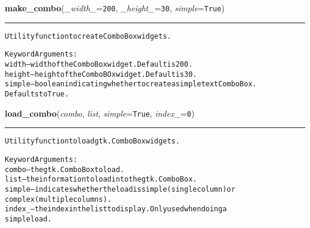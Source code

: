    \vspace{0.5ex}

\hspace{.8\funcindent}\begin{boxedminipage}{\funcwidth}

    \raggedright \textbf{make\_combo}(\textit{\_width\_}={\tt 200}, \textit{\_height\_}={\tt 30}, \textit{simple}={\tt True})

    \vspace{-1.5ex}

    \rule{\textwidth}{0.5\fboxrule}
\setlength{\parskip}{2ex}
\begin{alltt}
Utility function to create ComboBox widgets.

Keyword Arguments:
width  -- width of the ComboBox widget.  Default is 200.
height -- height of the ComboBOx widget.  Default is 30.
simple -- boolean indicating whether to create a simple text ComboBox.
          Defaults to True.
\end{alltt}

\setlength{\parskip}{1ex}
    \end{boxedminipage}

    \label{reliafree:widgets:load_combo}

    \vspace{0.5ex}

\hspace{.8\funcindent}\begin{boxedminipage}{\funcwidth}

    \raggedright \textbf{load\_combo}(\textit{combo}, \textit{list}, \textit{simple}={\tt True}, \textit{index\_}={\tt 0})

    \vspace{-1.5ex}

    \rule{\textwidth}{0.5\fboxrule}
\setlength{\parskip}{2ex}
\begin{alltt}
Utility function to load gtk.ComboBox widgets.

Keyword Arguments:
combo  -- the gtk.ComboBox to load.
list   -- the information to load into the gtk.ComboBox.
simple -- indicates whether the load is simple (single column) or
          complex (multiple columns).
index\_ -- the index in the list to display.  Only used when doing a
          simple load.
\end{alltt}

\setlength{\parskip}{1ex}
    \end{boxedminipage}

